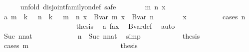 \begin{isabellebody}
\ \ \ \ \isamarkupfalse%
\ {\isacharparenleft}{\kern0pt}unfold\ disjoint{\isacharunderscore}{\kern0pt}family{\isacharunderscore}{\kern0pt}on{\isacharunderscore}{\kern0pt}def{\isacharsemicolon}{\kern0pt}\ safe{\isacharparenright}{\kern0pt}\isanewline
\ \ \ \ \ \ \isamarkupfalse%
\ m\ n\ x\ \isamarkupfalse%
\ a{\isacharcolon}{\kern0pt}\ {\isachardoublequoteopen}m\ {\isacharless}{\kern0pt}\ k\ {\isacharplus}{\kern0pt}\ {}{\isachardoublequoteclose}\ {\isachardoublequoteopen}n\ {\isacharless}{\kern0pt}\ k\ {\isacharplus}{\kern0pt}\ {}{\isachardoublequoteclose}\ {\isachardoublequoteopen}m\ {\isasymnoteq}\ n{\isachardoublequoteclose}\ {\isachardoublequoteopen}x\ {\isasymin}\ Bvar\ m{\isachardoublequoteclose}\ {\isachardoublequoteopen}x\ {\isasymin}\ Bvar\ n{\isachardoublequoteclose}\isanewline
\ \ \ \ \ \ \isamarkupfalse%
\ {\isachardoublequoteopen}x\ {\isasymin}\ {\isacharbraceleft}{\kern0pt}{\isacharbraceright}{\kern0pt}{\isachardoublequoteclose}\isanewline
\ \ \ \ \ \ \isamarkupfalse%
\ {\isacharparenleft}{\kern0pt}cases\ {\isachardoublequoteopen}n{\isachardoublequoteclose}{\isacharparenright}{\kern0pt}\isanewline
\ \ \ \ \ \ \ \ \isamarkupfalse%
\ {}\isanewline
\ \ \ \ \ \ \ \ \isamarkupfalse%
\ \isamarkupfalse%
\ {\isacharquery}{\kern0pt}thesis\ \isamarkupfalse%
\ a\ fax{}\ \isamarkupfalse%
\ Bvar{\isacharunderscore}{\kern0pt}def\ \isamarkupfalse%
\ auto\isanewline
\ \ \ \ \ \ \isamarkupfalse%
\isanewline
\ \ \ \ \ \ \ \ \isamarkupfalse%
\ {\isacharparenleft}{\kern0pt}Suc\ nnat{\isacharparenright}{\kern0pt}\isanewline
\ \ \ \ \ \ \ \ \isamarkupfalse%
\ \isamarkupfalse%
\ {\isacharasterisk}{\kern0pt}{\isacharcolon}{\kern0pt}\ {\isachardoublequoteopen}n\ {\isacharequal}{\kern0pt}\ Suc\ nnat{\isachardoublequoteclose}\ \isamarkupfalse%
\ simp\isanewline
\ \ \ \ \ \ \ \ \isamarkupfalse%
\ \isamarkupfalse%
\ {\isacharquery}{\kern0pt}thesis\ \isanewline
\ \ \ \ \ \ \ \ \isamarkupfalse%
\ {\isacharparenleft}{\kern0pt}cases\ m{\isacharparenright}{\kern0pt}\isanewline
\ \ \ \ \ \ \ \ \ \ \isamarkupfalse%
\ {}\isanewline
\ \ \ \ \ \ \ \ \ \ \isamarkupfalse%
\ \isamarkupfalse%
\ {\isacharquery}{\kern0pt}thesis\ \isamarkupfalse%

\end{isabellebody}
